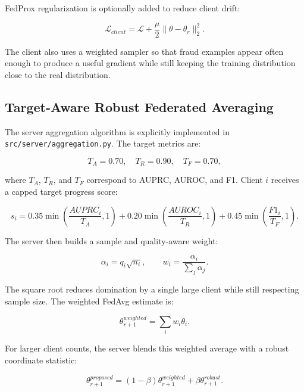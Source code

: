 \documentclass[conference]{IEEEtran}
\begin{document}
FedProx regularization is optionally added to reduce client drift:

\begin{equation}
\mathcal{L}_{client}=\mathcal{L}+\frac{\mu}{2}\|\theta-\theta_r\|_2^2.
\end{equation}

The client also uses a weighted sampler so that fraud examples appear often
enough to produce a useful gradient while still keeping the training
distribution close to the real distribution.

\subsection{Target-Aware Robust Federated Averaging}

The server aggregation algorithm is explicitly implemented in
\texttt{src/server/aggregation.py}. The target metrics are:

\begin{equation}
T_A=0.70,\quad T_R=0.90,\quad T_F=0.70,
\end{equation}

where \(T_A\), \(T_R\), and \(T_F\) correspond to AUPRC, AUROC, and F1. Client
\(i\) receives a capped target progress score:

\begin{equation}
s_i=0.35\min\left(\frac{AUPRC_i}{T_A},1\right)
+0.20\min\left(\frac{AUROC_i}{T_R},1\right)
+0.45\min\left(\frac{F1_i}{T_F},1\right).
\end{equation}

The server then builds a sample and quality-aware weight:

\begin{equation}
\alpha_i=q_i\sqrt{n_i},\qquad
w_i=\frac{\alpha_i}{\sum_j\alpha_j}.
\end{equation}

The square root reduces domination by a single large client while still
respecting sample size. The weighted FedAvg estimate is:

\begin{equation}
\theta^{weighted}_{r+1}=\sum_i w_i\theta_i.
\end{equation}

For larger client counts, the server blends this weighted average with a robust
coordinate statistic:

\begin{equation}
\theta^{proposed}_{r+1}
=(1-\beta)\theta^{weighted}_{r+1}
+\beta\theta^{robust}_{r+1}.
\end{equation}
\end{document}
